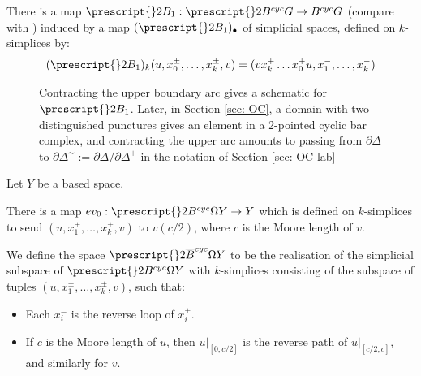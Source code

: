 \documentclass{TPmod}
\def\BB{\prescript{}2B}
\def\oBB{\prescript{}2{\overline B}}
\numberwithin{equation}{section}
\begin{document}
\begin{defn}
        There is a map $\BB_1: \BB^{cyc}G \to B^{cyc}G$ (compare with \cite[(2.196)]{Sheel:Duality}) induced by a map $(\BB_1)_\bullet$ of simplicial spaces, defined on $k$-simplices by:
        \begin{equation}\label{eq:2b1}
            (\BB_1)_k(u, x_0^\pm, \ldots, x_k^\pm, v) = (v x_k^+ \ldots x_0^+ u, x_1^-, \ldots, x_k^-)
        \end{equation}
    \end{defn}



\begin{figure}[ht]
\begin{center}
\caption{Contracting the upper boundary arc gives a schematic for $\BB_1$. Later, in Section \ref{sec: OC}, a domain with two distinguished punctures gives an element in a 2-pointed cyclic bar complex, and contracting the upper arc amounts to passing from $\partial \Delta$ to $\partial \Delta^{\sim} :=\partial \Delta / \partial \Delta^+$ in the notation of Section \ref{sec: OC lab}\label{fig:from 2-pointed to 1-pointed}}
\end{center}
\end{figure}

    
    \begin{defn}\label{def: ev0 bar}
        Let $Y$ be a based space. 

        There is a map $ev_0: \BB^{cyc}\Omega Y \to Y$ which is defined on $k$-simplices to send $(u, x_1^\pm, \ldots, x_k^\pm, v)$ to $v(c/2)$, where $c$ is the Moore length of $v$. 
        
        We define the space $\oBB^{cyc} \Omega Y$ to be the realisation of the simplicial subspace of $\BB^{cyc} \Omega Y$ with $k$-simplices consisting of the subspace of tuples $(u, x_1^\pm, \ldots, x_k^\pm, v)$, such that:
        \begin{itemize} 
            \item Each $x_i^-$ is the reverse loop of $x_i^+$.
            \item If $c$ is the Moore length of $u$, then $u|_{[0, c/2]}$ is the reverse path of $u|_{[c/2, c]}$, and similarly for $v$.
        \end{itemize}
    \end{defn}
\end{document}
